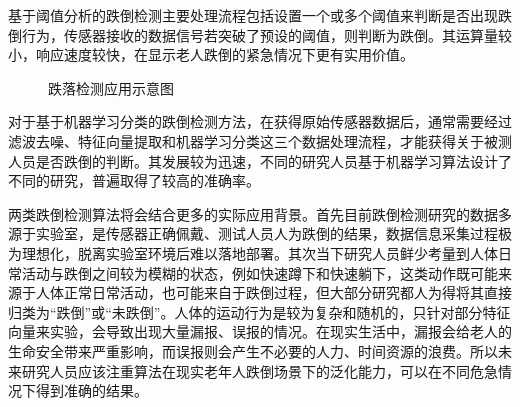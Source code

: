 \par{基于阈值分析的跌倒检测主要处理流程包括设置一个或多个阈值来判断是否出现跌倒行为，传感器接收的数据信号若突破了预设的阈值，则判断为跌倒。其运算量较小，响应速度较快，在显示老人跌倒的紧急情况下更有实用价值。}

\begin{figure}[htbp]
\centering

%
%

\centering
\caption{跌落检测应用示意图}\label{fig:1.1.1}
\end{figure}

\par{对于基于机器学习分类的跌倒检测方法，在获得原始传感器数据后，通常需要经过滤波去噪、特征向量提取和机器学习分类这三个数据处理流程，才能获得关于被测人员是否跌倒的判断。其发展较为迅速，不同的研究人员基于机器学习算法设计了不同的研究，普遍取得了较高的准确率。}
\par{两类跌倒检测算法将会结合更多的实际应用背景。首先目前跌倒检测研究的数据多源于实验室，是传感器正确佩戴、测试人员人为跌倒的结果，数据信息采集过程极为理想化，脱离实验室环境后难以落地部署。其次当下研究人员鲜少考量到人体日常活动与跌倒之间较为模糊的状态，例如快速蹲下和快速躺下，这类动作既可能来源于人体正常日常活动，也可能来自于跌倒过程，但大部分研究都人为得将其直接归类为“跌倒”或“未跌倒”。人体的运动行为是较为复杂和随机的，只针对部分特征向量来实验，会导致出现大量漏报、误报的情况。在现实生活中，漏报会给老人的生命安全带来严重影响，而误报则会产生不必要的人力、时间资源的浪费。所以未来研究人员应该注重算法在现实老年人跌倒场景下的泛化能力，可以在不同危急情况下得到准确的结果。}


